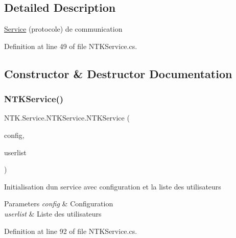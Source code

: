 \subsection{Detailed Description}
\mbox{\hyperlink{namespace_n_t_k_1_1_service}{Service}} (protocole) de communication 



Definition at line 49 of file N\+T\+K\+Service.\+cs.



\subsection{Constructor \& Destructor Documentation}
\mbox{\label{class_n_t_k_1_1_service_1_1_n_t_k_service_ae481738002a4ff9e84a28f900b077283}} 
\subsubsection{\texorpdfstring{NTKService()}{NTKService()}\hspace{0.1cm}{\footnotesize\ttfamily [1/3]}}
{\footnotesize\ttfamily N\+T\+K.\+Service.\+N\+T\+K\+Service.\+N\+T\+K\+Service (\begin{DoxyParamCaption}\item[{\mbox{\hyperlink{struct_n_t_k_1_1_service_1_1_service_config}{Service\+Config}}}]{config,  }\item[{List$<$ \mbox{\hyperlink{class_n_t_k_1_1_n_t_k_user}{N\+T\+K\+User}} $>$}]{userlist }\end{DoxyParamCaption})}



Initialisation d\textquotesingle{}un service avec configuration et la liste des utilisateurs 


\begin{DoxyParams}{Parameters}
{\em config} & Configuration\\
\hline
{\em userlist} & Liste des utilisateurs\\
\hline
\end{DoxyParams}


Definition at line 92 of file N\+T\+K\+Service.\+cs.

\mbox{\label{class_n_t_k_1_1_service_1_1_n_t_k_service_ab7f1a9e37216cfea00821caf98829436}} 
